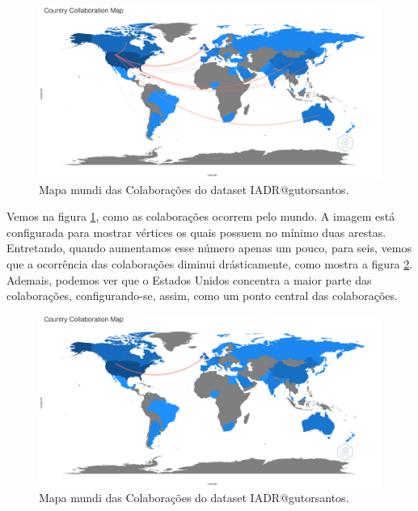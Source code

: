 \begin{figure}[H]
    \centering
\includegraphics[angle=0,width=1\textwidth]{experiments/gutorsantos/AnaliseBibliometrica/IAeDiscriminacao/imgs/CountryCollaborationMap-2022-02-09.png}
    \caption{Mapa mundi das Colaborações do dataset IADR@gutorsantos.}
    \label{fig:IADR@gutorsantos:WorldMap}
\end{figure}

Vemos na figura \ref{fig:IADR@gutorsantos:WorldMap}, como as colaborações ocorrem pelo mundo. A imagem está configurada para mostrar vértices os quais possuem no mínimo duas arestas. Entretando, quando aumentamos esse número apenas um pouco, para seis, vemos que a ocorrência das colaborações diminui drásticamente, como mostra a figura \ref{fig:IADR@gutorsantos:WorldMap2}. Ademais, podemos ver que o Estados Unidos concentra a maior parte das colaborações, configurando-se, assim, como um ponto central das colaborações.


\begin{figure}[H]
    \centering
\includegraphics[angle=0,width=1\textwidth]{experiments/gutorsantos/AnaliseBibliometrica/IAeDiscriminacao/imgs/CountryCollaborationMap-2022-02-09-param6.png}
    \caption{Mapa mundi das Colaborações do dataset IADR@gutorsantos.}
    \label{fig:IADR@gutorsantos:WorldMap2}
\end{figure}


